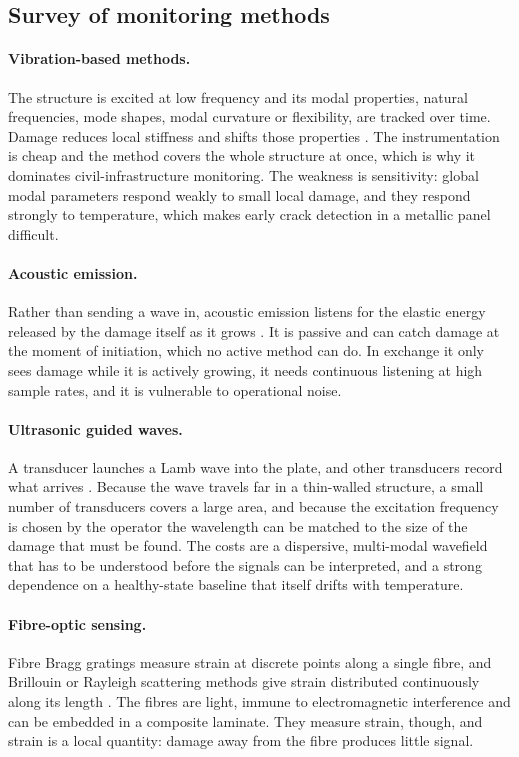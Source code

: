 \subsection{Survey of monitoring methods}

\paragraph{Vibration-based methods.}
The structure is excited at low frequency and its modal properties, natural frequencies, mode shapes, modal
curvature or flexibility, are tracked over time. Damage reduces local stiffness and shifts those properties
\cite{Yang2021Vib,Rabi2024}. The instrumentation is cheap and the method covers the whole structure at
once, which is why it dominates civil-infrastructure monitoring. The weakness is sensitivity: global modal
parameters respond weakly to small local damage, and they respond strongly to temperature, which makes
early crack detection in a metallic panel difficult.

\paragraph{Acoustic emission.}
Rather than sending a wave in, acoustic emission listens for the elastic energy released by the damage itself
as it grows \cite{Ghadarah2023,Muir2021}. It is passive and can catch damage at the moment of initiation,
which no active method can do. In exchange it only sees damage while it is actively growing, it needs
continuous listening at high sample rates, and it is vulnerable to operational noise.

\paragraph{Ultrasonic guided waves.}
A transducer launches a Lamb wave into the plate, and other transducers record what arrives
\cite{YangZ2023,Alem2016}. Because the wave travels far in a thin-walled structure, a small number of
transducers covers a large area, and because the excitation frequency is chosen by the operator the
wavelength can be matched to the size of the damage that must be found. The costs are a dispersive,
multi-modal wavefield that has to be understood before the signals can be interpreted, and a strong
dependence on a healthy-state baseline that itself drifts with temperature.

\paragraph{Fibre-optic sensing.}
Fibre Bragg gratings measure strain at discrete points along a single fibre, and Brillouin or Rayleigh
scattering methods give strain distributed continuously along its length
\cite{Alhussein2025,Barrias2016,Garcia2015}. The fibres are light, immune to electromagnetic interference
and can be embedded in a composite laminate. They measure strain, though, and strain is a local quantity:
damage away from the fibre produces little signal.

